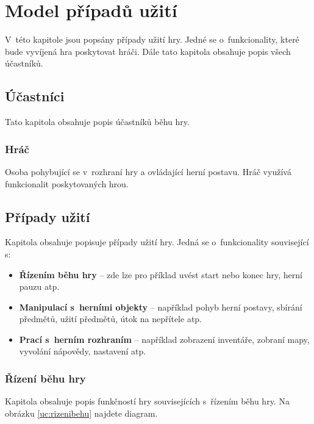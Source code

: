 \documentclass[12pt,a4paper]{article}
\begin{document}
\section{Model případů užití}
V~této kapitole jsou popsány případy užití hry. Jedné se o~funkcionality, které
bude vyvíjená hra poskytovat hráči. Dále tato kapitola obsahuje popis všech
účastníků.

\subsection{Účastníci}
Tato kapitola obsahuje popis účastníků běhu hry.

\subsubsection{Hráč}
Osoba pohybující se v~rozhraní hry a ovládající herní postavu. Hráč využívá
funkcionalit poskytovaných hrou.


\subsection{Případy užití}
Kapitola obsahuje popisuje případy užití hry. Jedná se o~funkcionality související s:

\begin{itemize}
  \item{\textbf{Řízením běhu hry} -- zde lze pro příklad uvést start nebo konec hry, herní
    pauzu atp.}
  \item{\textbf{Manipulací s~herními objekty} -- například pohyb herní postavy, sbírání
    předmětů, užití předmětů, útok na nepřítele atp.}
  \item{\textbf{Prací s~herním rozhraním} -- například zobrazení inventáře, zobraní mapy,
    vyvolání nápovědy, nastavení atp.}
\end{itemize}

\subsubsection{Řízení běhu hry}

Kapitola obsahuje popis funkčností hry souvisejících s~řízením běhu hry.
Na obrázku \ref{uc:rizenibehu} najdete diagram.
\end{document}
